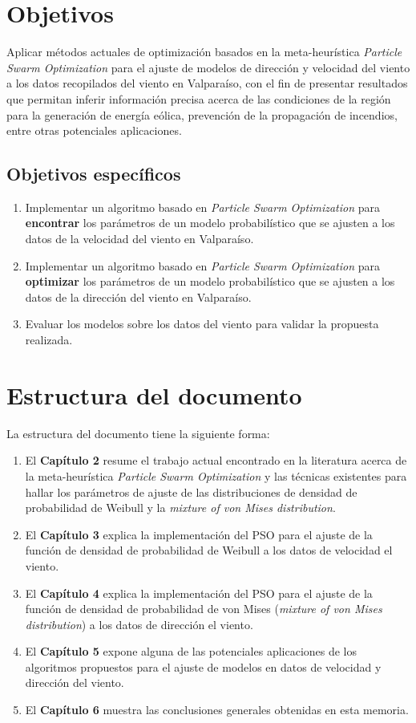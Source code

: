 \section{Objetivos}
Aplicar métodos actuales de optimización basados en la meta-heurística \emph{Particle Swarm Optimization} para el ajuste de modelos de dirección y velocidad del viento a los datos recopilados del viento en Valparaíso, con el fin de presentar resultados que permitan inferir información precisa acerca de las condiciones de la región para la generación de energía eólica, prevención de la propagación de incendios, entre otras potenciales aplicaciones.

\subsection{Objetivos específicos}
\begin{enumerate}
    \item Implementar un algoritmo basado en \emph{Particle Swarm Optimization} para \textbf{encontrar} los parámetros de un modelo probabilístico que se ajusten a los datos de la velocidad del viento en Valparaíso. 
    \item Implementar un algoritmo basado en \emph{Particle Swarm Optimization} para \textbf{optimizar} los parámetros de un modelo probabilístico que se ajusten a los datos de la dirección del viento en Valparaíso.
    \item Evaluar los modelos sobre los datos del viento para validar la propuesta realizada.
\end{enumerate}

\section{Estructura del documento}
La estructura del documento tiene la siguiente forma:
\begin{enumerate}
  \item El \textbf{Capítulo 2} resume el trabajo actual encontrado en la literatura acerca de la meta-heurística \emph{Particle Swarm Optimization} y las técnicas existentes para hallar los parámetros de ajuste de las distribuciones de densidad de probabilidad de Weibull y la \emph{mixture of von Mises distribution}.
  \item El \textbf{Capítulo 3} explica la implementación del PSO para el ajuste de la función de densidad de probabilidad de Weibull a los datos de velocidad el viento.
  \item El \textbf{Capítulo 4} explica la implementación del PSO para el ajuste de la función de densidad de probabilidad de von Mises (\emph{mixture of von Mises distribution}) a los datos de dirección el viento.
  \item El \textbf{Capítulo 5} expone alguna de las potenciales aplicaciones de los algoritmos propuestos para el ajuste de modelos en datos de velocidad y dirección del viento.
  \item El \textbf{Capítulo 6} muestra las conclusiones generales obtenidas en esta memoria. 
\end{enumerate}